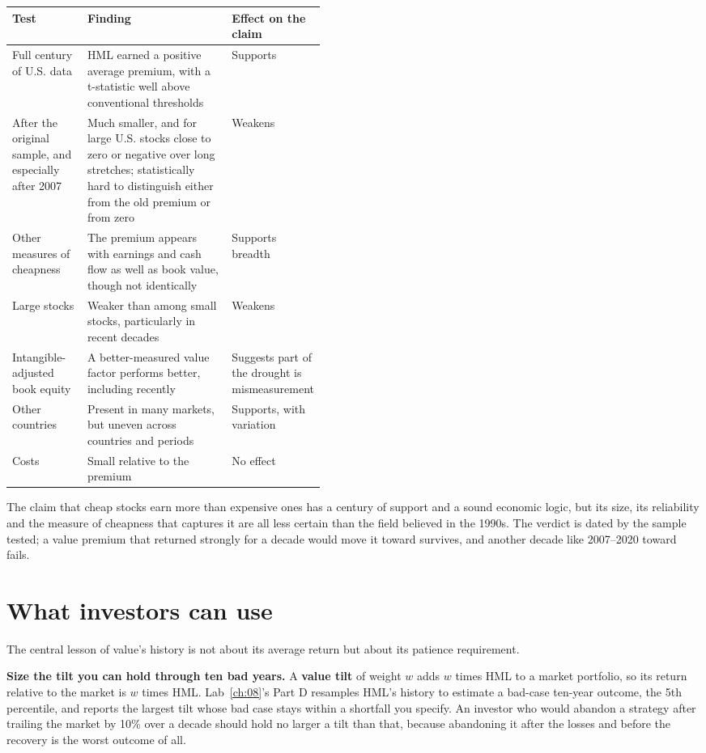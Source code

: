 \begin{center}
\small
\begin{tabularx}{0.9\linewidth}{@{}>{\raggedright\arraybackslash}p{0.24\linewidth}>{\raggedright\arraybackslash}X>{\raggedright\arraybackslash}p{0.21\linewidth}@{}}
\toprule
Test & Finding & Effect on the claim \\
\midrule
Full century of U.S. data & HML earned a positive average premium, with a t-statistic well above conventional thresholds & Supports \\
After the original sample, and especially after 2007 & Much smaller, and for large U.S. stocks close to zero or negative over long stretches; statistically hard to distinguish either from the old premium or from zero & Weakens \\
Other measures of cheapness & The premium appears with earnings and cash flow as well as book value, though not identically & Supports breadth \\
Large stocks & Weaker than among small stocks, particularly in recent decades & Weakens \\
Intangible-adjusted book equity & A better-measured value factor performs better, including recently & Suggests part of the drought is mismeasurement \\
Other countries & Present in many markets, but uneven across countries and periods & Supports, with variation \\
Costs & Small relative to the premium & No effect \\
\bottomrule
\end{tabularx}
\end{center}

The claim that cheap stocks earn more than expensive ones has a century of support and a sound economic logic, but its size, its reliability and the measure of cheapness that captures it are all less certain than the field believed in the 1990s. The verdict is dated by the sample tested; a value premium that returned strongly for a decade would move it toward survives, and another decade like 2007--2020 toward fails.

\section{What investors can use}
\label{sec:08-investors}

The central lesson of value's history is not about its average return but about its patience requirement.

\textbf{Size the tilt you can hold through ten bad years.} A \textbf{value tilt} of weight $w$ adds $w$ times HML to a market portfolio, so its return relative to the market is $w$ times HML. Lab~\ref{ch:08}'s Part D resamples HML's history to estimate a bad-case ten-year outcome, the 5th percentile, and reports the largest tilt whose bad case stays within a shortfall you specify. An investor who would abandon a strategy after trailing the market by 10\% over a decade should hold no larger a tilt than that, because abandoning it after the losses and before the recovery is the worst outcome of all.

